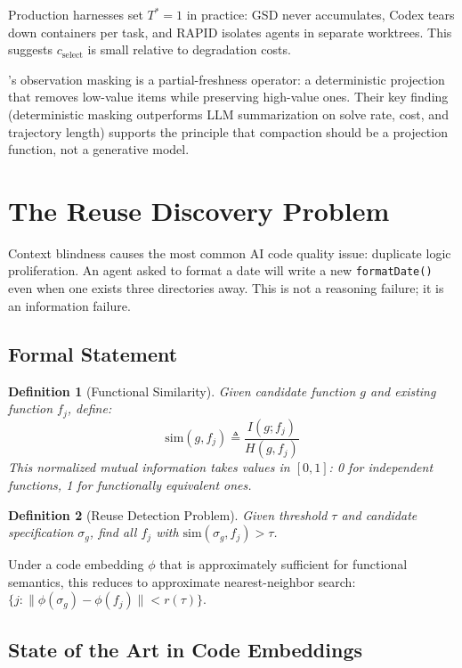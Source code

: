 \documentclass[11pt, a4paper, copyright]{googledeepmind}
\newtheorem{definition}{Definition}[section]
\begin{document}
Production harnesses set $T^* = 1$ in practice: GSD never accumulates, Codex tears down containers per task, and RAPID isolates agents in separate worktrees. This suggests $c_{\text{select}}$ is small relative to degradation costs.

\citet{jetbrains2025complexity}'s observation masking is a partial-freshness operator: a deterministic projection that removes low-value items while preserving high-value ones. Their key finding (deterministic masking outperforms LLM summarization on solve rate, cost, and trajectory length) supports the principle that compaction should be a projection function, not a generative model.


\section{The Reuse Discovery Problem}
\label{sec:reuse}

Context blindness causes the most common AI code quality issue: duplicate logic proliferation. An agent asked to format a date will write a new \texttt{formatDate()} even when one exists three directories away. This is not a reasoning failure; it is an information failure.

\subsection{Formal Statement}

\begin{definition}[Functional Similarity]
Given candidate function $g$ and existing function $f_j$, define:
$$\text{sim}(g, f_j) \triangleq \frac{I(g; f_j)}{H(g, f_j)}$$
This normalized mutual information takes values in $[0,1]$: 0 for independent functions, 1 for functionally equivalent ones.
\end{definition}

\begin{definition}[Reuse Detection Problem]
Given threshold $\tau$ and candidate specification $\sigma_g$, find all $f_j$ with $\text{sim}(\sigma_g, f_j) > \tau$.
\end{definition}

Under a code embedding $\phi$ that is approximately sufficient for functional semantics, this reduces to approximate nearest-neighbor search: $\{j : \|\phi(\sigma_g) - \phi(f_j)\| < r(\tau)\}$.

\subsection{State of the Art in Code Embeddings}
\end{document}
